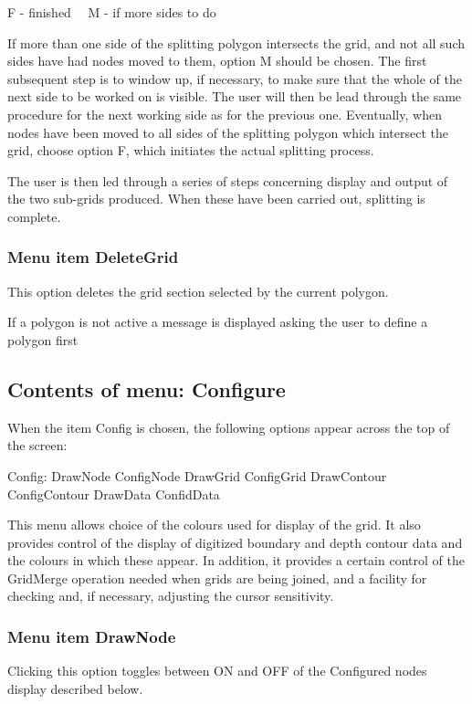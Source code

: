 \documentclass{article}
\begin{document}
F - finished \ \ M - if more sides to do

If more than one side of the splitting polygon intersects the grid, and not all such sides have had nodes moved to them, option M should be chosen. The first subsequent step is to window up, if necessary, to make sure that the whole of the next side to be worked on is visible. The user will then be lead through the same procedure for the next working side as for the previous one. Eventually, when nodes have been moved to all sides of the splitting polygon which intersect the grid, choose option F, which initiates the actual splitting process.

The user is then led through a series of steps concerning display and output of the two sub-grids produced. When these have been carried out, splitting is complete.

\subsubsection[Menu item DeleteGrid]{Menu item DeleteGrid}
This option deletes the grid section selected by the current polygon.

If a polygon is not active a message is displayed asking the user to define a polygon first



\subsection{Contents of menu: Configure}
When the item Config is chosen, the following options appear across the top of the screen:

Config: DrawNode ConfigNode {\textbar} DrawGrid ConfigGrid {\textbar} DrawContour ConfigContour {\textbar} DrawData ConfidData

This menu allows choice of the colours used for display of the grid. It also provides control of the display of digitized boundary and depth contour data and the colours in which these appear. In addition, it provides a certain control of the GridMerge operation needed when grids are being joined, and a facility for checking and, if necessary, adjusting the cursor sensitivity.

\subsubsection[Menu item DrawNode]{Menu item DrawNode}
Clicking this option toggles between ON and OFF of the Configured nodes display described below.
\end{document}
